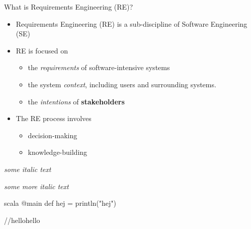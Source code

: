 
\begin{Slide}{What is Requirements Engineering (RE)?}

\begin{itemize}
\item Requirements Engineering (RE) is a sub-discipline of Software Engineering (SE) 

\item RE is focused on 

\begin{itemize}
\item the \textit{requirements} of software-intensive systems 
\item the system \textit{context}, including users and surrounding systems.
\item the \textit{intentions} of \textbf{stakeholders}

\end{itemize}
\item The RE process involves 
\begin{itemize}
\item decision-making
\item knowledge-building
 
\end{itemize}
\end{itemize}
\textit{some italic text}


\textit{some more italic text}

scala
@main def hej = println("hej")

//hellohello


\end{Slide}
